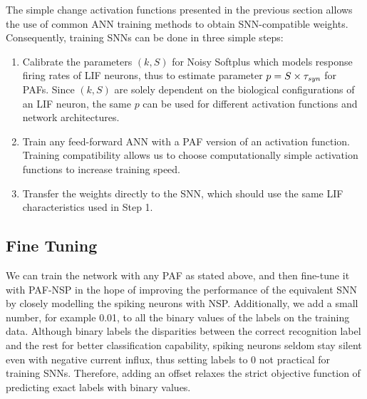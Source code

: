 	The simple change \DIFdelbegin {}\DIFdelend \DIFaddbegin {}\DIFaddend activation functions presented in the previous section allows the use of common ANN training methods to obtain SNN-compatible weights.
	Consequently, training SNNs can be done in three simple steps: 
	\begin{enumerate}
		\item Calibrate the parameters $(k, S)$ for Noisy Softplus which models \DIFaddbegin {}\DIFaddend response firing rates of LIF neurons, thus to estimate \DIFaddbegin {}\DIFaddend parameter $p=S \times \tau_{\textit{\textrm{syn}}}$ for PAFs. Since $(k, S)$ are solely dependent on the biological configurations of an LIF neuron, the same $p$ can be used for different activation functions and network architectures.
		\item Train any feed-forward ANN with a PAF version of an activation function.
		Training compatibility allows us to choose computationally simple activation functions to increase training speed.
		\item Transfer the weights directly to the SNN, which should use the same LIF characteristics used in Step 1.
	\end{enumerate}

	\subsection{Fine Tuning}
	We can train the network with any PAF as stated above, and then fine-tune it with PAF-NSP in the hope of improving the performance of the equivalent SNN by closely modelling the spiking neurons with NSP.
	Additionally, we add a small number, for example 0.01, to all the binary values of the labels on the training data.
	Although binary labels \DIFdelbegin {}\DIFdelend \DIFaddbegin {}\DIFaddend the disparities between the correct recognition label and the rest for better classification capability, 
	spiking neurons seldom stay silent even with negative current influx, thus setting labels to 0 \DIFdelbegin {}\DIFdelend \DIFaddbegin {}\DIFaddend not practical for training SNNs.
	Therefore, adding an offset relaxes the strict objective function of predicting exact labels with binary values.

